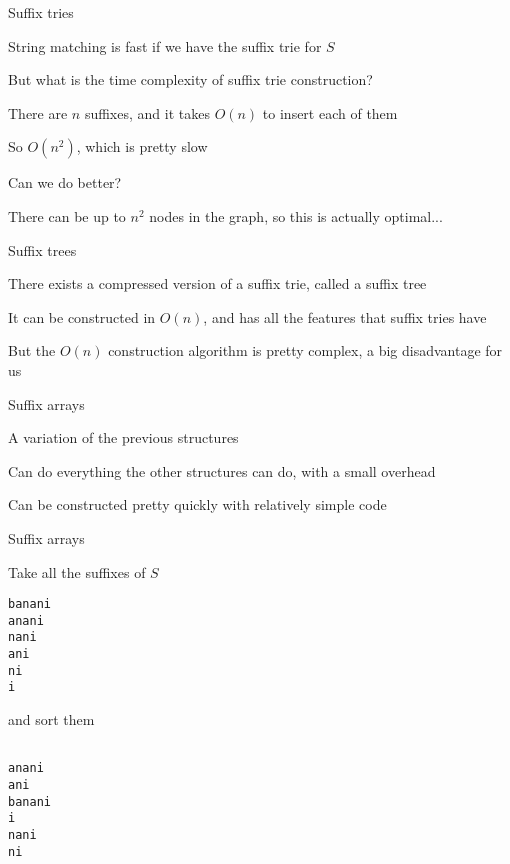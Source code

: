 \begin{frame}{Suffix tries}
    \bi
        \item String matching is fast if we have the suffix trie for $S$
            \vspace{10pt}
        \item But what is the time complexity of suffix trie construction?
        \item There are $n$ suffixes, and it takes $O(n)$ to insert each of them
        \item So $O(n^2)$, which is pretty slow
            \vspace{10pt}
        \item Can we do better?
        \item There can be up to $n^2$ nodes in the graph, so this is actually optimal...
    \ei
\end{frame}

\begin{frame}{Suffix trees}
    \bi
        \item There exists a compressed version of a suffix trie, called a suffix tree
        \vspace{10pt}
    \item It can be constructed in $O(n)$, and has all the features that suffix tries have
    \item But the $O(n)$ construction algorithm is pretty complex, a big disadvantage for us
    \ei
\end{frame}

\begin{frame}{Suffix arrays}
    \bi
        \item A variation of the previous structures
        \item Can do everything the other structures can do, with a small overhead
        \item Can be constructed pretty quickly with relatively simple code
    \ei
\end{frame}

\begin{frame}[fragile]{Suffix arrays}
    \bi
        \item Take all the suffixes of $S$
    \ei
    \begin{verbatim}
banani
anani
nani
ani
ni
i

    \end{verbatim}
    \bi
        \item and sort them
    \ei
    \begin{verbatim}

anani
ani
banani
i
nani
ni
    \end{verbatim}

\end{frame}

